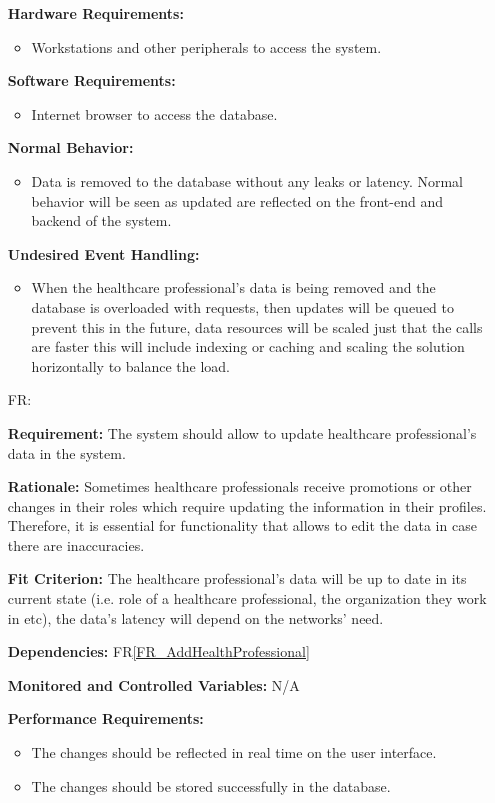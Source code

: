 \documentclass[12pt]{article}
\newcounter{reqnum} %
\begin{document}
\begin{itemize}
\textbf{Hardware Requirements:}
\begin{itemize}
  \item Workstations and other peripherals to access the system.
\end{itemize} 

\textbf{Software Requirements:}
\begin{itemize}
  \item Internet browser to access the database.
\end{itemize} 

\textbf{Normal Behavior:}
\begin{itemize}
  \item Data is removed to the database without any leaks or latency. Normal behavior will be seen as updated are reflected on the front-end and backend of the system.
\end{itemize} 

\textbf{Undesired Event Handling:}
\begin{itemize}
  \item When the healthcare professional’s data is being removed and the database is overloaded with requests, then updates will be queued to prevent this in the future, data resources will be scaled just that the calls are faster this will include indexing or caching and scaling the solution horizontally to balance the load.
\end{itemize} 

\item[FR\refstepcounter{reqnum}\thereqnum \label{FR_UpdateHealthProfessionals}:]

\textbf{Requirement:} The system should allow to update healthcare professional’s data in the system.

\textbf{Rationale:} Sometimes healthcare professionals receive promotions or other changes in their roles which require updating the information in their profiles. Therefore, it is essential for functionality that allows to edit the data in case there are inaccuracies.  

\textbf{Fit Criterion:} The healthcare professional’s data will be up to date in its current state (i.e. role of a healthcare professional, the organization they work in etc), the data’s latency will depend on the networks’ need. 

\textbf{Dependencies:} FR\ref{FR_AddHealthProfessional}

\textbf{Monitored and Controlled Variables:} N/A

\textbf{Performance Requirements:} 
\begin{itemize}
  \item The changes should be reflected in real time on the user interface.
  \item The changes should be stored successfully in the database.
\end{itemize} 


\end{itemize}
\end{document}
